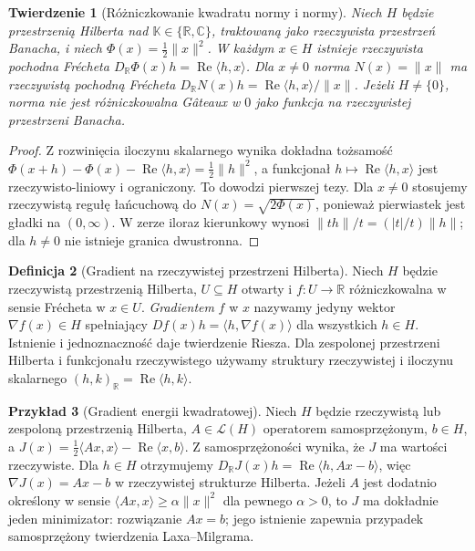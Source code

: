\documentclass[11pt,a4paper]{article}
\numberwithin{equation}{section}
\theoremstyle{plain}
\newtheorem{twierdzenie}{Twierdzenie}[section]
\theoremstyle{definition}
\newtheorem{definicja}[twierdzenie]{Definicja}
\newtheorem{przyklad}[twierdzenie]{Przykład}
\theoremstyle{remark}
\newcommand{\R}{\mathbb R}
\newcommand{\C}{\mathbb C}
\newcommand{\K}{\mathbb K}
\begin{document}
\begin{twierdzenie}[Różniczkowanie kwadratu normy i normy]
\label{thm:hilbert-norm14}
Niech $H$ będzie przestrzenią Hilberta nad $\K\in\{\R,\C\}$, traktowaną jako \emph{rzeczywista} przestrzeń Banacha, i niech $\Phi(x)=\frac12\|x\|^2$. W każdym $x\in H$ istnieje rzeczywista pochodna Frécheta $D_{\R}\Phi(x)h=\operatorname{Re}\langle h,x\rangle$. Dla $x\ne0$ norma $N(x)=\|x\|$ ma rzeczywistą pochodną Frécheta
$D_{\R}N(x)h=\operatorname{Re}\langle h,x\rangle/\|x\|$.
Jeżeli $H\ne\{0\}$, norma nie jest różniczkowalna Gâteaux w $0$ jako funkcja na rzeczywistej przestrzeni Banacha.
\end{twierdzenie}
\begin{proof}
Z rozwinięcia iloczynu skalarnego wynika dokładna tożsamość
$\Phi(x+h)-\Phi(x)-\operatorname{Re}\langle h,x\rangle=\frac12\|h\|^2$, a funkcjonał $h\mapsto\operatorname{Re}\langle h,x\rangle$ jest rzeczywisto-liniowy i ograniczony. To dowodzi pierwszej tezy. Dla $x\ne0$ stosujemy rzeczywistą regułę łańcuchową do $N(x)=\sqrt{2\Phi(x)}$, ponieważ pierwiastek jest gładki na $(0,\infty)$. W zerze iloraz kierunkowy wynosi $\|th\|/t=(|t|/t)\|h\|$; dla $h\ne0$ nie istnieje granica dwustronna.
\end{proof}

\begin{definicja}[Gradient na rzeczywistej przestrzeni Hilberta]
\label{def:gradient14}
Niech $H$ będzie rzeczywistą przestrzenią Hilberta, $U\subseteq H$ otwarty i $f:U\to\R$ różniczkowalna w sensie Frécheta w $x\in U$. \emph{Gradientem} $f$ w $x$ nazywamy jedyny wektor $\nabla f(x)\in H$ spełniający $Df(x)h=\langle h,\nabla f(x)\rangle$ dla wszystkich $h\in H$. Istnienie i jednoznaczność daje twierdzenie Riesza. Dla zespolonej przestrzeni Hilberta i funkcjonału rzeczywistego używamy struktury rzeczywistej i iloczynu skalarnego $(h,k)_{\R}=\operatorname{Re}\langle h,k\rangle$.
\end{definicja}

\begin{przyklad}[Gradient energii kwadratowej]
\label{ex:quadratic-energy14}
Niech $H$ będzie rzeczywistą lub zespoloną przestrzenią Hilberta, $A\in\mathcal L(H)$ operatorem samosprzężonym, $b\in H$, a $J(x)=\frac12\langle Ax,x\rangle-\operatorname{Re}\langle x,b\rangle$. Z samosprzężoności wynika, że $J$ ma wartości rzeczywiste. Dla $h\in H$ otrzymujemy
$D_{\R}J(x)h=\operatorname{Re}\langle h,Ax-b\rangle$, więc $\nabla J(x)=Ax-b$ w rzeczywistej strukturze Hilberta. Jeżeli $A$ jest dodatnio określony w sensie $\langle Ax,x\rangle\ge\alpha\|x\|^2$ dla pewnego $\alpha>0$, to $J$ ma dokładnie jeden minimizator: rozwiązanie $Ax=b$; jego istnienie zapewnia przypadek samosprzężony twierdzenia Laxa--Milgrama.
\end{przyklad}
\end{document}

